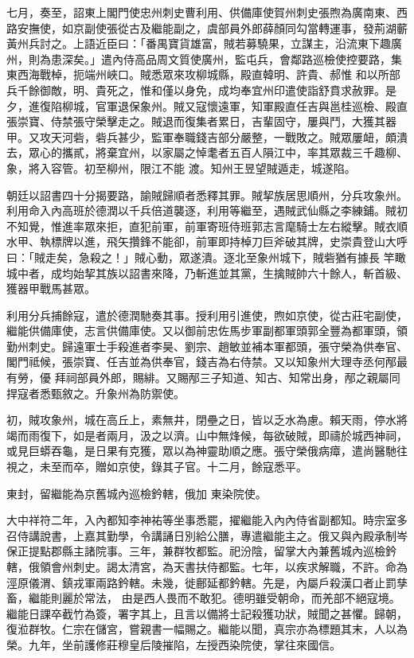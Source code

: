\begin{pinyinscope}
 七月，奏至，詔東上閣門使忠州刺史曹利用、供備庫使賀州刺史張煦為廣南東、西路安撫使，如京副使張從古及繼能副之，虞部員外郎薛顏同勾當轉運事，發荊湖蘄黃州兵討之。上語近臣曰：「番禺寶貨雄富，賊若募驍果，立謀主，沿流東下趣廣州，則為患深矣。」遣內侍高品周文質使廣州，監屯兵，會鄰路巡檢使控要路，集東西海戰棹，扼端州峽口。賊悉眾來攻柳城縣，殿直韓明、許貴、郝惟
 和以所部兵千餘御敵，明、貴死之，惟和僅以身免，成均奉宜州印遣使詣舒賁求赦罪。是夕，進復陷柳城，官軍退保象州。賊又寇懷遠軍，知軍殿直任吉與邕桂巡檢、殿直張崇寶、侍禁張守榮擊走之。賊退而復集者累日，吉輩固守，屢與鬥，大獲其器甲。又攻天河砦，砦兵甚少，監軍奉職錢吉部分嚴整，一戰敗之。賊眾屢衄，頗潰去，眾心的攜貳，將棄宜州，以家屬之悼耄者五百人隕江中，率其眾裁三千趣柳、象，將入容管。初至柳州，限江不能
 渡。知州王昱望賊遁走，城遂陷。



 朝廷以詔書四十分揭要路，諭賊歸順者悉釋其罪。賊挈族居思順州，分兵攻象州。利用命入內高班於德潤以千兵倍道襲逐，利用等繼至，遇賊武仙縣之李練鋪。賊初不知覺，惟進率眾來拒，直犯前軍，前軍寄班侍班郭志言麾騎士左右縱擊。賊衣順水甲、執標牌以進，飛矢攢鋒不能卻，前軍即持棹刀巨斧破其牌，史崇貴登山大呼曰：「賊走矣，急殺之！」賊心動，眾遂潰。逐北至象州城下，賊砦猶有據長
 竿瞰城中者，成均始挈其族以詔書來降，乃斬進並其黨，生擒賊帥六十餘人，斬首級、獲器甲戰馬甚眾。



 利用分兵捕餘寇，遣於德潤馳奏其事。授利用引進使，煦如京使，從古莊宅副使，繼能供備庫使，志言供備庫使。又以御前忠佐馬步軍副都軍頭郭全豐為都軍頭，領勤州刺史。歸遠軍士手殺進者李昊、劉宗、趙敏並補本軍都頭，張守榮為供奉官、閣門祗候，張崇寶、任吉並為供奉官，錢吉為右侍禁。又以知象州大理寺丞何邴最有勞，優
 拜祠部員外郎，賜緋。又賜邴三子知道、知古、知常出身，邴之親屬同捍寇者悉甄敘之。升象州為防禦使。



 初，賊攻象州，城在高丘上，素無井，閉壘之日，皆以乏水為慮。賴天雨，停水將竭而雨復下，如是者兩月，汲之以濟。山中無烽候，每欲破賊，即禱於城西神祠，或見巨蟒吞龜，是日果有克獲，眾以為神靈助順之應。張守榮俄病瘴，遣尚醫馳往視之，未至而卒，贈如京使，錄其子官。十二月，餘寇悉平。



 東封，留繼能為京舊城內巡檢鈐轄，俄加
 東染院使。



 大中祥符二年，入內都知李神祐等坐事悉罷，擢繼能入內內侍省副都知。時宗室多召侍講說書，上嘉其勤學，令講誦日別給公膳，專遣繼能主之。俄又與內殿承制岑保正提點郡縣主諸院事。三年，兼群牧都監。祀汾陰，留掌大內兼舊城內巡檢鈐轄，俄領會州刺史。謁太清宮，為天書扶侍都監。七年，以疾求解職，不許。命為涇原儀渭、鎮戎軍兩路鈐轄。未幾，徙鄜延都鈐轄。先是，內屬戶殺漢口者止罰孳畜，繼能則麗於常法，
 由是西人畏而不敢犯。德明雖受朝命，而羌部不絕寇境。繼能日課卒截竹為簽，署字其上，且言以備將士記殺獲功狀，賊聞之甚懼。歸朝，復涖群牧。仁宗在儲宮，嘗親書一幅賜之。繼能以聞，真宗亦為標題其末，人以為榮。九年，坐前護修莊穆皇后陵摧陷，左授西染院使，掌往來國信。




\end{pinyinscope}
